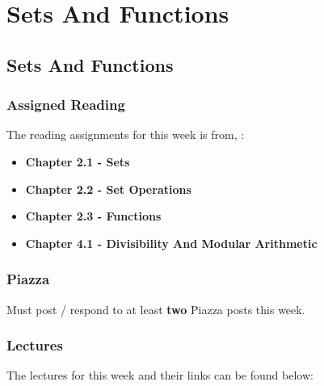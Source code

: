 \clearpage

\renewcommand{\ChapTitle}{Sets And Functions}
\renewcommand{\SectionTitle}{Sets And Functions}

\chapter{\ChapTitle}
\section{\SectionTitle}

\subsection{Assigned Reading}

The reading assignments for this week is from, \Textbook:

\begin{itemize}
    \item \textbf{Chapter 2.1 - Sets}
    \item \textbf{Chapter 2.2 - Set Operations}
    \item \textbf{Chapter 2.3 - Functions}
    \item \textbf{Chapter 4.1 - Divisibility And Modular Arithmetic}
\end{itemize}

\subsection{Piazza}

Must post / respond to at least \textbf{two} Piazza posts this week.

\subsection{Lectures}

The lectures for this week and their links can be found below:

